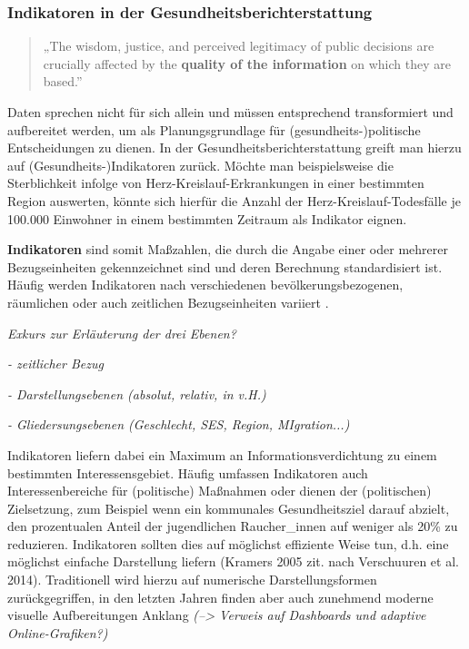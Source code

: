 \documentclass{article}
\begin{document}
\subsubsection{\textbf{Indikatoren in der Gesundheitsberichterstattung}}\label{H9252754}


\begin{quote}



„The wisdom, justice, and perceived legitimacy of public decisions are crucially affected by the \textbf{quality of the information }on which they are based.”

\autocite{InstituteofMedicine(U.S.)1988}


\end{quote}


Daten sprechen nicht für sich allein und müssen entsprechend transformiert und aufbereitet werden, um als Planungsgrundlage für (gesundheits-)politische Entscheidungen zu dienen. In der Gesundheitsberichterstattung greift man hierzu auf (Gesundheits-)Indikatoren zurück. Möchte man beispielsweise die Sterblichkeit infolge von Herz-Kreislauf-Erkrankungen in einer bestimmten Region auswerten, könnte sich hierfür die Anzahl der Herz-Kreislauf-Todesfälle je 100.000 Einwohner in einem bestimmten Zeitraum als Indikator eignen. 


\textbf{Indikatoren }sind somit Maßzahlen, die durch die Angabe einer oder mehrerer Bezugseinheiten gekennzeichnet sind und deren Berechnung standardisiert ist. Häufig werden Indikatoren nach verschiedenen bevölkerungsbezogenen, räumlichen oder auch zeitlichen Bezugseinheiten variiert \autocite{HamburgerProjektgruppeGesundheitsberichterstattung1998}.


\emph{Exkurs zur Erläuterung der drei Ebenen?}\emph{ }

\emph{- zeitlicher Bezug}

\emph{- Darstellungsebenen (absolut, relativ, in v.H.)}

\emph{- Gliedersungsebenen (Geschlecht, SES, Region, MIgration...)}


Indikatoren liefern dabei ein Maximum an Informationsverdichtung zu einem bestimmten Interessensgebiet. Häufig umfassen Indikatoren auch Interessenbereiche für (politische) Maßnahmen oder dienen der (politischen) Zielsetzung, zum Beispiel wenn ein kommunales Gesundheitsziel darauf abzielt, den prozentualen Anteil der jugendlichen Raucher\_innen auf weniger als 20\% zu reduzieren. Indikatoren sollten dies auf möglichst effiziente Weise tun, d.h. eine möglichst einfache Darstellung liefern (Kramers 2005 zit. nach Verschuuren et al. 2014). Traditionell wird hierzu auf numerische Darstellungsformen zurückgegriffen, in den letzten Jahren finden aber auch zunehmend moderne visuelle Aufbereitungen Anklang \emph{(--> Verweis auf Dashboards und adaptive Online-Grafiken?) }
\end{document}
